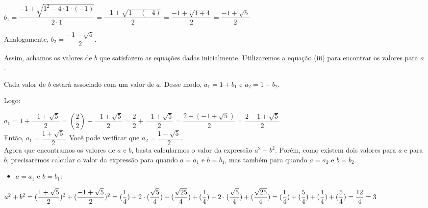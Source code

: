 \documentclass[a4paper, 12pt]{article}
\begin{document}
   \(b_{1} = \dfrac{-1 + \sqrt{1^2 - 4\cdot{1}\cdot{(-1)}}}{2\cdot{1}} = \dfrac{-1 + \sqrt{1 - (-4)}}{2} = \dfrac{-1 + \sqrt{1 + 4}}{2} = \dfrac{-1 + \sqrt{5}}{2}\)   
 
 
 \noindent Analogamente, \(b_{2} = \dfrac{-1 - \sqrt{5}}{2}\). %
 

 
 

 
 \noindent Assim, achamos os valores de \(b\) que satisfazem as equações dadas inicialmente. Utilizaremos a equação (iii) para encontrar os valores para   \(a\). 
 
 \noindent Cada valor de   \(b\) estará associado com um valor de \(a\). Desse modo,   \(a_{1} = 1 + b_{1}\) e   \(a_{2} = 1 + b_{2}\). 
 
 \noindent Logo: 
 
   \(a_{1} = 1 + \dfrac{-1 + \sqrt{5}}{2} = (\dfrac{2}{2}) + \dfrac{-1 + \sqrt{5}}{2} = \dfrac{2}{2} + \dfrac{-1 + \sqrt{5}}{2} = \dfrac{2 + (-1 + \sqrt{5})}{2} = \dfrac{2 - 1 + \sqrt{5}}{2}\) \\
 
 \noindent Então, \quad \(a_{1} =  \dfrac{1 + \sqrt{5}}{2}\).  Você pode verificar que \(a_{2} = \dfrac{1 - \sqrt{5}}{2}\). \\
 
 
 
 
 \noindent Agora que encontramos os valores de \(a\) e \(b\), basta calcularmos o valor da expressão   \(a^2 + b^2\). Porém, como existem dois valores para \(a\) e para \(b\), precisaremos calcular o valor da expressão para quando \(a = a_{1}\) e   \(b = b_{1}\), mas também para quando   \(a = a_{2}\)  e   \(b = b_{2}\). 

 \begin{itemize}
     \item   \(a = a_{1}\) e \(b = b_{1}\): 
  \end{itemize}
    
  \noindent  \(a^2 + b^2 = (\dfrac{1 + \sqrt{5}}{2})^2 + (\dfrac{-1 + \sqrt{5}}{2})^2 = (\dfrac{1}{4}) + 2\cdot{(\dfrac{\sqrt{5}}{4})}  + (\dfrac{\sqrt{25}}{4}) + (\dfrac{1}{4}) - 2\cdot{(\dfrac{\sqrt{5}}{4})}  + (\dfrac{\sqrt{25}}{4}) = \\ \\ (\dfrac{1}{4}) + (\dfrac{5}{4}) + (\dfrac{1}{4}) + (\dfrac{5}{4}) = \dfrac{12}{4} = 3\)  \\
     
\end{document}
